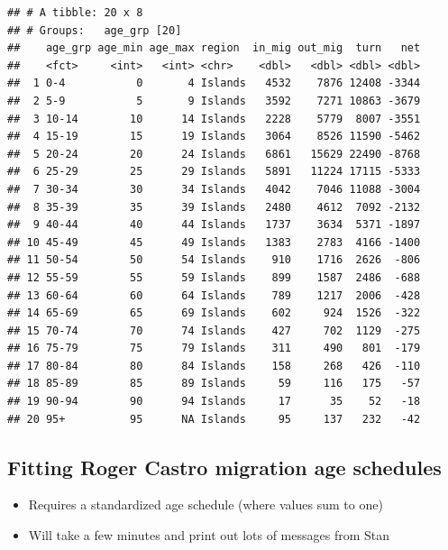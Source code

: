 \documentclass[
]{book}
\newenvironment{Shaded}{\begin{snugshade}}{\end{snugshade}}
\newcommand{\FunctionTok}[1]{\textcolor[rgb]{0.00,0.00,0.00}{#1}}
\newcommand{\NormalTok}[1]{#1}
\newcommand{\OtherTok}[1]{\textcolor[rgb]{0.56,0.35,0.01}{#1}}
\newcommand{\SpecialCharTok}[1]{\textcolor[rgb]{0.00,0.00,0.00}{#1}}
\providecommand{\tightlist}{%
  \setlength{\itemsep}{0pt}\setlength{\parskip}{0pt}}
\begin{document}
\begin{verbatim}
## # A tibble: 20 x 8
## # Groups:   age_grp [20]
##    age_grp age_min age_max region  in_mig out_mig  turn   net
##    <fct>     <int>   <int> <chr>    <dbl>   <dbl> <dbl> <dbl>
##  1 0-4           0       4 Islands   4532    7876 12408 -3344
##  2 5-9           5       9 Islands   3592    7271 10863 -3679
##  3 10-14        10      14 Islands   2228    5779  8007 -3551
##  4 15-19        15      19 Islands   3064    8526 11590 -5462
##  5 20-24        20      24 Islands   6861   15629 22490 -8768
##  6 25-29        25      29 Islands   5891   11224 17115 -5333
##  7 30-34        30      34 Islands   4042    7046 11088 -3004
##  8 35-39        35      39 Islands   2480    4612  7092 -2132
##  9 40-44        40      44 Islands   1737    3634  5371 -1897
## 10 45-49        45      49 Islands   1383    2783  4166 -1400
## 11 50-54        50      54 Islands    910    1716  2626  -806
## 12 55-59        55      59 Islands    899    1587  2486  -688
## 13 60-64        60      64 Islands    789    1217  2006  -428
## 14 65-69        65      69 Islands    602     924  1526  -322
## 15 70-74        70      74 Islands    427     702  1129  -275
## 16 75-79        75      79 Islands    311     490   801  -179
## 17 80-84        80      84 Islands    158     268   426  -110
## 18 85-89        85      89 Islands     59     116   175   -57
## 19 90-94        90      94 Islands     17      35    52   -18
## 20 95+          95      NA Islands     95     137   232   -42
\end{verbatim}

\hypertarget{fitting-roger-castro-migration-age-schedules-2}{%
\subsection{Fitting Roger Castro migration age schedules}\label{fitting-roger-castro-migration-age-schedules-2}}

\begin{itemize}
\tightlist
\item
  Requires a standardized age schedule (where values sum to one)
\item
  Will take a few minutes and print out lots of messages from Stan
\end{itemize}

\begin{Shaded}
\end{Shaded}
\end{document}
